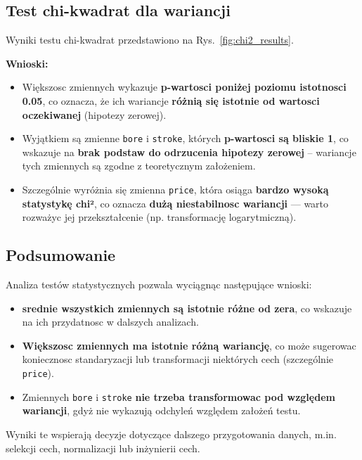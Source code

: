 \documentclass[12pt,a4paper]{article}
\begin{document}
\subsection{Test chi-kwadrat dla wariancji}

Wyniki testu chi-kwadrat przedstawiono na Rys.~\ref{fig:chi2_results}.

\textbf{Wnioski:}

\begin{itemize}
    \item Większosc zmiennych wykazuje \textbf{p-wartosci poniżej poziomu istotnosci 0.05}, co oznacza, że ich wariancje \textbf{różnią się istotnie od wartosci oczekiwanej} (hipotezy zerowej).
    \item Wyjątkiem są zmienne \texttt{bore} i \texttt{stroke}, których \textbf{p-wartosci są bliskie 1}, co wskazuje na \textbf{brak podstaw do odrzucenia hipotezy zerowej} – wariancje tych zmiennych są zgodne z teoretycznym założeniem.
    \item Szczególnie wyróżnia się zmienna \texttt{price}, która osiąga \textbf{bardzo wysoką statystykę chi²}, co oznacza \textbf{dużą niestabilnosc wariancji} — warto rozważyc jej przekształcenie (np. transformację logarytmiczną).
\end{itemize}

\subsection{Podsumowanie}

Analiza testów statystycznych pozwala wyciągnąc następujące wnioski:

\begin{itemize}
    \item \textbf{srednie wszystkich zmiennych są istotnie różne od zera}, co wskazuje na ich przydatnosc w dalszych analizach.
    \item \textbf{Większosc zmiennych ma istotnie różną wariancję}, co może sugerowac koniecznosc standaryzacji lub transformacji niektórych cech (szczególnie \texttt{price}).
    \item Zmiennych \texttt{bore} i \texttt{stroke} \textbf{nie trzeba transformowac pod względem wariancji}, gdyż nie wykazują odchyleń względem założeń testu.
\end{itemize}

Wyniki te wspierają decyzje dotyczące dalszego przygotowania danych, m.in. selekcji cech, normalizacji lub inżynierii cech.
\end{document}
